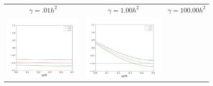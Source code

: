 \documentclass[12pt, reqno]{report}
\theoremstyle{definition}
\theoremstyle{remark}
\begin{document}
\def\ampwidth{.2\paperwidth}
\begin{figure}[H]
    \centering

    \begin{tabular}{ccc}
        $\gamma=.01h^2$ & $\gamma=1.00h^2$ & $\gamma=100.00h^2$ \\
        \includegraphics[width = \ampwidth]{media_paper/ga0.01_AC_FD.png} &
        \includegraphics[width = \ampwidth]{media_paper/ga1_AC_FD.png} &

\end{tabular}
\end{figure}
\end{document}
